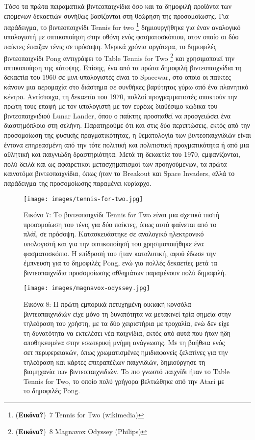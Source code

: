 \documentclass[
]{article}
\begin{document}
Τόσο τα πρώτα πειραματικά βιντεοπαιχνίδια όσο και τα δημοφιλή προϊόντα
των επόμενων δεκαετιών συνήθως βασίζονται στη θεώρηση της προσομοίωσης.
Για παράδειγμα, το βιντεοπαιχνίδι Tennis for two \footnote{(\textbf{Εικόνα?})~7
  Tennis for Two (wikimedia)} δημιουργήθηκε για έναν αναλογικό
υπολογιστή με οπτικοποίηση στην οθόνη ενός φασματοσκόπιου, στον οποίο οι
δύο παίκτες έπαιζαν τένις σε πρόσοψη. Μερικά χρόνια αργότερα, το
δημοφιλές βιντεοπαιχνίδι Pong αντιγράφει το Table Tennis for Two
\footnote{(\textbf{Εικόνα?})~8 Magnavox Odyssey (Philips)} και
χρησιμοποιεί την οπτικοποίηση της κάτοψης. Επίσης, ένα από τα πρώτα
δημοφιλή βιντεοπαιχνίδια τη δεκαετία του 1960 σε μινι-υπολογιστές είναι
το Spacewar, στο οποίο οι παίκτες κάνουν μια αερομαχία στο διάστημα σε
συνθήκες βαρύτητας γύρω από ένα πλανητικό κέντρο. Αντίστοιχα, τη
δεκαετία του 1970, πολλοί προγραμματιστές αποκτούν την πρώτη τους επαφή
με τον υπολογιστή με τον ευρέως διαθέσιμο κώδικα του βιντεοπαιχνιδιού
Lunar Lander, όπου ο παίκτης προσπαθεί να προσγειώσει ένα διαστημόπλοιο
στη σελήνη. Παρατηρούμε ότι και στις δύο περιπτώσεις, εκτός από την
προσομοίωση της φυσικής πραγματικότητας, η θεματολογία των
βιντεοπαιχνιδιών είναι έντονα επηρεασμένη από την τότε πολιτική και
πολιτιστική πραγματικότητα ή από μια αθλητική και παιγνιώδη
δραστηριότητα. Μετά τη δεκαετία του 1970, εμφανίζονται, πολύ δειλά και
ως αφαιρετικοί μετασχηματισμοί των προηγούμενων, τα πρώτα καινοτόμα
βιντεοπαιχνίδια, όπως ήταν τα Breakout και Space Invaders, αλλά το
παράδειγμα της προσομοίωσης παραμένει κυρίαρχο.

\leavevmode{}%
\begin{figure}
\hypertarget{fig:tennis-for-two}{%
\centering
\texttt{[image: images/tennis-for-two.jpg]}
\caption{Εικόνα 7: Το βιντεοπαιχνίδι Tennis for Two είναι μια σχετικά
πιστή προσομοίωση του τένις για δύο παίκτες, όπως αυτό φαίνεται από το
πλάϊ, σε πρόσοψη. Κατασκευάστηκε σε αναλογικό ηλεκτρονικό υπολογιστή και
για την οπτικοποίησή του χρησιμοποιήθηκε ένα φασματοσκόπιο. Η επίδρασή
του ήταν καταλυτική, αφού έδωσε την έμπνευση για το δημοφιλές Pong, ενώ
για πολλές δεκαετίες μετά τα βιντεοπαιχνίδια προσομοίωσης αθλημάτων
παραμένουν πολύ δημοφιλή.}\label{fig:tennis-for-two}
}
\end{figure}

\leavevmode{}%
\begin{figure}
\hypertarget{fig:magnavox-odyssey}{%
\centering
\texttt{[image: images/magnavox-odyssey.jpg]}
\caption{Εικόνα 8: Η πρώτη εμπορικά πετυχημένη οικιακή κονσόλα
βιντεοπαιχνιδιών είχε μόνο τη δυνατότητα να μετακινεί τρία σημεία στην
τηλεόραση του χρήστη, με τα δύο χειριστήρια με τροχαλία, ενώ δεν είχε τη
δυνατότητα να εκτελέσει νέα παιχνίδια, εκτός από αυτά που ήταν ήδη
αποθηκευμένα στην εσωτερική μνήμη ανάγνωσης. Με τη βοήθεια ενός σετ
περιφερειακών, όπως χρωματισμένες ημιδιαφανείς ζελατίνες για την
τηλεόραση και κάρτες επιτραπέζιων παιχνιδιών, δημιούργησε τη βιομηχανία
των βιντεοπαιχνιδιών. To πιο γνωστό παιχνίδι ήταν το Table Tennis for
Two, το οποίο πολύ γρήγορα βελτιώθηκε από την Atari με το δημοφιλές
Pong.}\label{fig:magnavox-odyssey}
}
\end{figure}
\end{document}
